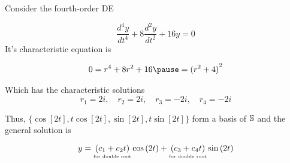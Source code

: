 \documentclass{beamer}
\begin{document}
\begin{frame}
\begin{example}
Consider the fourth-order DE

\vspace{-1mm}
\begin{equation*}
\dfrac{d^4y}{dt^4}
+8\dfrac{d^2y}{dt^2}
+16y
=0
\end{equation*}\pause
It's characteristic equation is

\vspace{-1mm}
\begin{equation*}
\begin{aligned}
0=r^4+8r^2+16\pause
={(r^2+4)}^2
\end{aligned}
\end{equation*}\pause

\vspace{-3mm}
Which has the characteristic solutions
\begin{equation*}
r_1=2i,\quad
r_2=2i,\quad
r_3=-2i,\quad
r_4=-2i
\end{equation*}\pause

\vspace{-3mm}
Thus, $\{\cos[2t],t\cos[2t],\sin[2t],t\sin[2t]\}$ form a basis of $\mathbb{S}$ and the general solution is

\vspace{-4mm}
\begin{equation*}
y=\underset{\text{\tiny for double root}}{(c_1+c_2t)}\cos[2t]
 +\underset{\text{\tiny for double root}}{(c_3+c_4t)}\sin[2t]
\end{equation*}
\end{example}
\end{frame}
\end{document}
